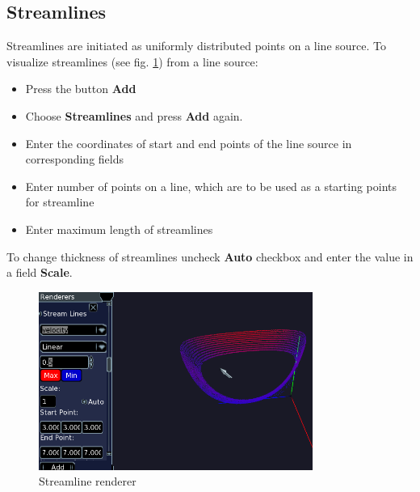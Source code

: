 \documentclass[
12pt, %
a4paper, %
oneside, %
headinclude,footinclude, %
BCOR5mm, %
]{scrartcl}
\begin{document}
\subsection{Streamlines}
Streamlines are initiated as uniformly distributed points on a line source. To visualize streamlines (see fig. \ref{fig:streamlines}) from a line source:
\begin{itemize}
\item Press the button \textbf{Add}
\item Choose \textbf{Streamlines} and press \textbf{Add} again.
\item Enter the coordinates of start and end points of the line source in corresponding fields
\item Enter number of points on a line, which are to be used as a starting points for streamline
\item Enter maximum length of streamlines
\end{itemize}
To change thickness of streamlines uncheck \textbf{Auto} checkbox and enter the value in a field \textbf{Scale}.
\begin{figure}
 \includegraphics[width=0.8\textwidth]{streamlines.png}
   \caption{Streamline renderer}
   \label{fig:streamlines}
\end{figure}
\end{document}
